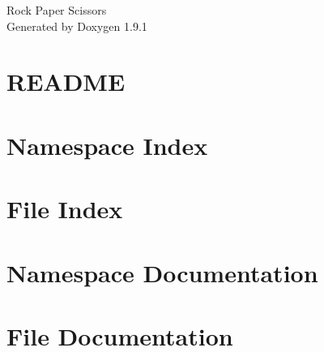 \let\mypdfximage\pdfximage\def\pdfximage{\immediate\mypdfximage}\documentclass[twoside]{book}
\newcommand{\+}{\discretionary{\mbox{\scriptsize$\hookleftarrow$}}{}{}}
\newcommand{\clearemptydoublepage}{%
  \newpage{\pagestyle{empty}\cleardoublepage}%
}
\begin{document}
\raggedbottom

\hypersetup{pageanchor=false,
             bookmarksnumbered=true,
             pdfencoding=unicode
            }
\begin{titlepage}
\vspace*{7cm}
\begin{center}%
{\Large Rock Paper Scissors }\\
\vspace*{1cm}
{\large Generated by Doxygen 1.9.1}\\
\end{center}
\end{titlepage}
\clearemptydoublepage
{}
\tableofcontents
\clearemptydoublepage
{}
\hypersetup{pageanchor=true}

\chapter{README}
\label{md_README}

\chapter{Namespace Index}

\chapter{File Index}

\chapter{Namespace Documentation}

\chapter{File Documentation}




\backmatter
\newpage
{}
\clearemptydoublepage
{}
\printindex
\end{document}
